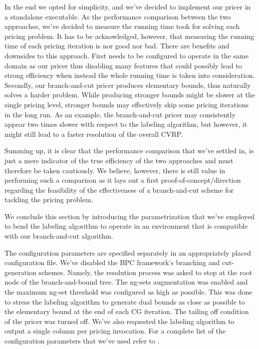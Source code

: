 \medskip

In the end we opted for simplicity, and we've decided to implement our pricer in a standalone executable.
As the performance comparison between the two approaches, we've decided to measure
the running time took for solving each pricing problem.
It has to be acknowledged, however, that measuring the running time of each pricing iteration
is nor good nor bad.
There are benefits and downsides to this approach.
First \bapcod{} needs to be configured to operate in the same domain as our pricer
thus disabling many features that could possibly lead to strong efficiency
when instead the whole running time is taken into consideration.
Secondly, our branch-and-cut pricer produces elementary bounds, thus naturally solves a harder problem.
While producing stronger bounds might be slower at the single pricing level, stronger bounds
may effectively skip some pricing iterations in the long run.
As an example, the branch-and-cut pricer may consistently appear two times slower with
respect to the labeling algorithm, but however, it might still
lead to a faster resolution of the overall CVRP.

Summing up, it is clear that the performance comparison that we've settled in, is just
a mere indicator of the true efficiency of the two approaches and must
therefore be taken cautiously.
We believe, however, there is still value in performing such a comparison as it lays
out a first proof-of-concept/direction regarding the feasibility of the effectiveness
of a branch-and-cut scheme for tackling the pricing problem.

\medskip

We conclude this section by introducing the \bapcod{} parametrization
that we've employed to bend the labeling algorithm to operate in
an environment that is compatible with our branch-and-cut algorithm.

The configuration parameters are specified separately
in an appropriately placed configuration file.
We've disabled the BPC framework's branching and cut-generation schemes.
Namely, the resolution process was asked to stop at
the root node of the branch-and-bound tree.
The ng-sets augmentation was enabled and the maximum ng-set threshold was configured
as high as possible. This was done to stress the labeling algorithm to generate dual bounds as close
as possible to the elementary bound at the end of each CG iteration.
The tailing off condition of the pricer was turned off.
We've also requested the labeling algorithm to output a single column per pricing invocation.
For a complete list of the configuration parameters
that  we've used refer to .

